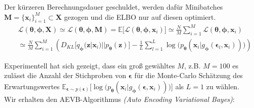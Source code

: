 \documentclass[12pt]{article}
\newcommand{\qenc}{q_{\boldsymbol\phi}(\mathbf{z}|\mathbf{x}_i)}
\newcommand{\z}{\mathbf{z}}
\begin{document}
	Der kürzeren Berechnungsdauer geschuldet, werden dafür Minibatches $\textbf{M} = \{\textbf{x}_{i}\}_{i=1}^{M} \subset \textbf{X}$ gezogen und die ELBO nur auf diesen optimiert.
	\begin{align*}
	&\mathcal{L}(\boldsymbol\theta,\boldsymbol\phi,\textbf{X}) \simeq \mathcal{L}(\boldsymbol\theta,\boldsymbol\phi,\textbf{M}) = \mathbb{E}\lbrack\mathcal{L}(\boldsymbol\theta,\boldsymbol\phi,\textbf{x}_{i})\rbrack \simeq \frac{N}{M}\sum_{i=1}^{M}\mathcal{L}(\boldsymbol\theta,\boldsymbol\phi,\textbf{x}_{i})\\
	&\simeq \frac{N}{M}\sum_{i=1}^{M}  \left(D_{KL}\big[\qenc||p_{\boldsymbol\theta}(\z)\big] - \frac{1}{L}\sum_{l=1}^{L}\log\big(p_{\boldsymbol\theta}(\textbf{x}_{i}|g_{\boldsymbol\phi}(\boldsymbol\epsilon_{l},\textbf{x}_{i}))\big)\right)
	\end{align*}

	Experimentell hat sich gezeigt, dass ein groß gewähltes $M$, z.B. $M=100$ es zulässt die Anzahl der Stichproben von $\boldsymbol\epsilon$ für die Monte-Carlo Schätzung des Erwartungswertes $\mathbb{E}_{\boldsymbol\epsilon\sim p(\boldsymbol\epsilon)}\big[\log\big(p_{\boldsymbol\theta}(\textbf{x}_{i}|g_{\boldsymbol\phi}(\boldsymbol\epsilon,\textbf{x}_{i}))\big)\big]$ als $L=1$ zu wählen.
	\\
	Wir erhalten den AEVB-Algorithmus \emph{(Auto Encoding Variational Bayes)}: \\
\end{document}
